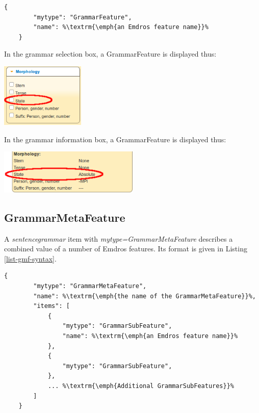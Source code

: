 \documentclass[11pt,oneside,a4paper]{memoir}
\begin{document}
\begin{lstlisting}[caption=GrammarFeature syntax,label=list-gf-syntax]
    {
        "mytype": "GrammarFeature",
        "name": %\textrm{\emph{an Emdros feature name}}%
    }
\end{lstlisting}

\Needspace*{5cm}%
In the grammar selection box, a GrammarFeature is displayed thus:

\begin{center}
  \includegraphics[width=0.3\textwidth]{state1.png}
\end{center}

\Needspace*{5cm}%
In the grammar information box, a GrammarFeature is displayed thus:

\begin{center}
  \includegraphics[width=0.5\textwidth]{state2.png}
\end{center}


\subsection{GrammarMetaFeature}\label{sec-grammarmetafeature}

A \emph{sentencegrammar} item with \emph{mytype=GrammarMetaFeature} describes a combined value of a
number of Emdros features. Its format is given in Listing \ref{list-gmf-syntax}.

\begin{lstlisting}[caption=GrammarMetaFeature syntax,label=list-gmf-syntax]
    {
        "mytype": "GrammarMetaFeature",
        "name": %\textrm{\emph{the name of the GrammarMetaFeature}}%,
        "items": [
            {
                "mytype": "GrammarSubFeature",
                "name": %\textrm{\emph{an Emdros feature name}}%
            },
            {
                "mytype": "GrammarSubFeature",
            },
            ... %\textrm{\emph{Additional GrammarSubFeatures}}%
        ]
    }
\end{lstlisting}
\end{document}
